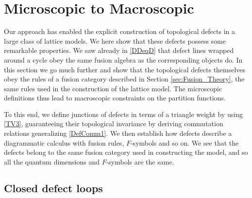 
\section{Microscopic to Macroscopic}
\label{sec:trivalent}

Our approach has enabled the explicit construction of topological defects in a large class of lattice models.
We here show that these defects possess some remarkable properties.  We saw already in \eqref{DDeqD} that defect lines wrapped around a cycle obey the same fusion algebra as the corresponding objects do. In this section we go much further and show that the topological defects themselves obey the rules of a fusion category described in Section \ref{sec:Fusion_Theory}, the same rules used in the construction of the lattice model. The microscopic definitions thus lead to macroscopic constraints on the partition functions.

To this end, we define junctions of defects in terms of a triangle weight by using \eqref{TV3}, guaranteeing their topological invariance by deriving commutation relations generalizing \eqref{DefComm1}. We then establish how defects describe a diagrammatic calculus with fusion rules, $F$-symbols and so on. We see that the defects belong to the same fusion category used in constructing the model, and so all the quantum dimensions and $F$-symbols are the same. 

\subsection{Closed defect loops}


